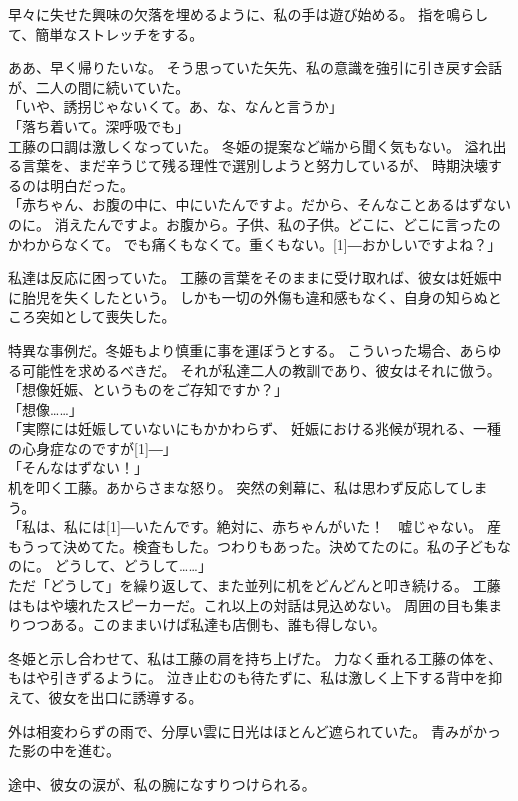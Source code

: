 \documentclass[../HiganMain]{subfiles}
\begin{document}
早々に失せた興味の欠落を埋めるように、私の手は遊び始める。
指を鳴らして、簡単なストレッチをする。

ああ、早く帰りたいな。
そう思っていた矢先、私の意識を強引に引き戻す会話が、二人の間に続いていた。\\
「いや、誘拐じゃないくて。あ、な、なんと言うか」\\
「落ち着いて。深呼吸でも」\\
工藤の口調は激しくなっていた。
冬姫の提案など端から聞く気もない。
溢れ出る言葉を、まだ辛うじて残る理性で選別しようと努力しているが、
時期決壊するのは明白だった。\\
「赤ちゃん、お腹の中に、中にいたんですよ。だから、そんなことあるはずないのに。
消えたんですよ。お腹から。子供、私の子供。どこに、どこに言ったのかわからなくて。
でも痛くもなくて。重くもない。\scalebox{3}[1]{―}おかしいですよね？」

私達は反応に困っていた。
工藤の言葉をそのままに受け取れば、彼女は妊娠中に胎児を失くしたという。
しかも一切の外傷も違和感もなく、自身の知らぬところ突如として喪失した。

特異な事例だ。冬姫もより慎重に事を運ぼうとする。
こういった場合、あらゆる可能性を求めるべきだ。
それが私達二人の教訓であり、彼女はそれに倣う。\\
「想像妊娠、というものをご存知ですか？」\\
「想像……」\\
「実際には妊娠していないにもかかわらず、
妊娠における兆候が現れる、一種の心身症なのですが\scalebox{3}[1]{―}」\\
「そんなはずない！」\\
机を叩く工藤。あからさまな怒り。
突然の剣幕に、私は思わず反応してしまう。\\
「私は、私には\scalebox{3}[1]{―}いたんです。絶対に、赤ちゃんがいた！　嘘じゃない。
産もうって決めてた。検査もした。つわりもあった。決めてたのに。私の子どもなのに。
どうして、どうして……」\\
ただ「どうして」を繰り返して、また並列に机をどんどんと叩き続ける。
工藤はもはや壊れたスピーカーだ。これ以上の対話は見込めない。
周囲の目も集まりつつある。このままいけば私達も店側も、誰も得しない。

冬姫と示し合わせて、私は工藤の肩を持ち上げた。
力なく垂れる工藤の体を、もはや引きずるように。
泣き止むのも待たずに、私は激しく上下する背中を抑えて、彼女を出口に誘導する。

外は相変わらずの雨で、分厚い雲に日光はほとんど遮られていた。
青みがかった影の中を進む。

途中、彼女の涙が、私の腕になすりつけられる。
\end{document}
